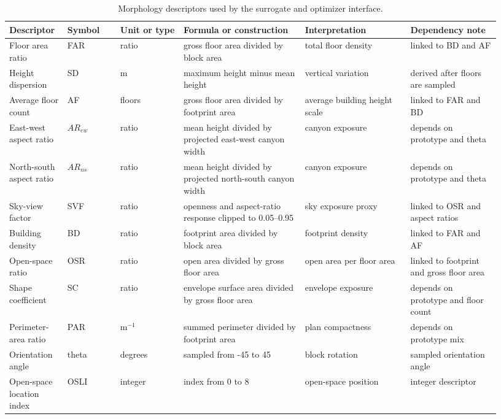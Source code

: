 \begin{table}[H]
\begin{revblock}
\caption{Morphology descriptors used by the surrogate and optimizer interface.}
\label{tab:descriptors}
\centering
\scriptsize
\begin{threeparttable}
\begin{tabularx}{\linewidth}{@{}p{0.11\linewidth}p{0.10\linewidth}p{0.12\linewidth}p{0.23\linewidth}p{0.20\linewidth}p{0.17\linewidth}@{}}
\toprule
Descriptor & Symbol & Unit or type & Formula or construction & Interpretation & Dependency note \\
\midrule
Floor area ratio & FAR & ratio & gross floor area divided by block area & total floor density & linked to BD and AF \\
Height dispersion & SD & m & maximum height minus mean height & vertical variation & derived after floors are sampled \\
Average floor count & AF & floors & gross floor area divided by footprint area & average building height scale & linked to FAR and BD \\
East-west aspect ratio & $AR_{ew}$ & ratio & mean height divided by projected east-west canyon width & canyon exposure & depends on prototype and theta \\
North-south aspect ratio & $AR_{ns}$ & ratio & mean height divided by projected north-south canyon width & canyon exposure & depends on prototype and theta \\
Sky-view factor & SVF & ratio & openness and aspect-ratio response clipped to 0.05--0.95 & sky exposure proxy & linked to OSR and aspect ratios \\
Building density & BD & ratio & footprint area divided by block area & footprint density & linked to FAR and AF \\
Open-space ratio & OSR & ratio & open area divided by gross floor area & open area per floor area & linked to footprint and gross floor area \\
Shape coefficient & SC & ratio & envelope surface area divided by gross floor area & envelope exposure & depends on prototype and floor count \\
Perimeter-area ratio & PAR & m$^{-1}$ & summed perimeter divided by footprint area & plan compactness & depends on prototype mix \\
Orientation angle & theta & degrees & sampled from -45 to 45 & block rotation & sampled orientation angle \\
Open-space location index & OSLI & integer & index from 0 to 8 & open-space position & integer descriptor \\
\bottomrule
\end{tabularx}
\end{threeparttable}
\end{revblock}
\end{table}

